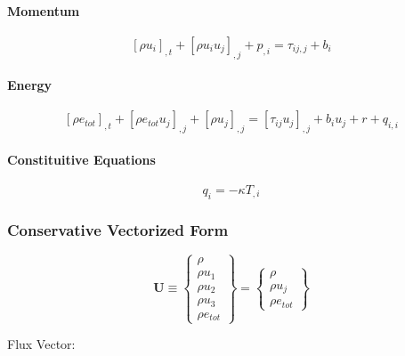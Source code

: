 \documentclass[11pt, letterpaper, twoside]{article}
\newcommand{\etot}{e_{tot}}
\renewcommand{\vec}[1]{\bm{#1}}
\newcommand{\U}{\vec{U}}
\begin{document}
    \paragraph{Momentum}
        \begin{equation}\label{eq:fund_momentum}
            \left[\rho u_i \right]_{,t} + \left[\rho u_i u_j \right]_{,j} + p_{,i} = \tau_{ij,j} + b_i
        \end{equation}
        
    \paragraph{Energy}
        \begin{equation}\label{eq:fund_energy}
            \left[\rho \etot \right]_{,t} + 
            \left[\rho \etot u_j \right]_{,j} + \left[\rho u_j \right]_{,j} 
            = \left[\tau_{ij} u_j \right]_{,j} + b_i u_j + r + q_{i,i}
        \end{equation}
    
    \paragraph{Constituitive Equations} 
    \begin{equation}
        q_{i} = -\kappa T_{,i}
    \end{equation}
    
    \subsubsection{Conservative Vectorized Form}

    \begin{equation}
        \U \equiv
        \begin{Bmatrix}
            \rho \\
            \rho u_1 \\
            \rho u_2 \\
            \rho u_3 \\
            \rho \etot
        \end{Bmatrix}
        =
        \begin{Bmatrix}
            \rho \\
            \rho u_j \\
            \rho \etot
        \end{Bmatrix}
    \end{equation}

    Flux Vector:
\end{document}
